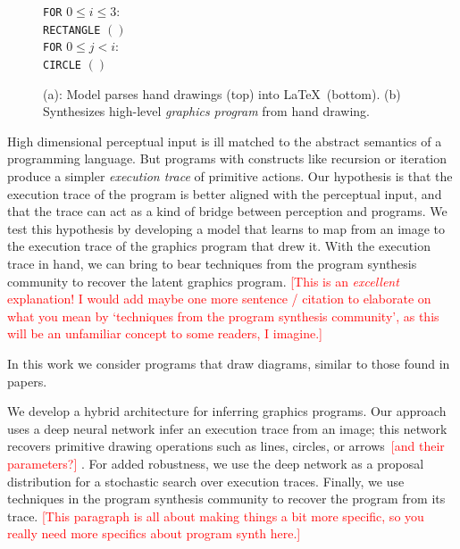 \documentclass{article}
\newcommand{\remark}[1]{\textcolor{red}{[#1]}}
\begin{document}
\begin{figure}[h]
\begin{minipage}[t]{0.8\linewidth}
\begin{tabular}{llll}
\end{tabular}
\subcaption{}
  \end{minipage}%
  \begin{minipage}[t]{0.2\linewidth}
    \texttt{FOR} $0\leq i\leq 3$:\\
    \texttt{RECTANGLE} $()$\\
    \texttt{FOR} $0\leq j < i$:\\
    \texttt{CIRCLE} $()$\\
    \subcaption{}
  \end{minipage}
  \caption{(a): Model parses hand drawings (top) into \LaTeX~(bottom). (b) Synthesizes high-level \emph{graphics program} from hand drawing.}
  \end{figure}

High dimensional perceptual input is ill matched to the abstract
semantics of a programming language. But programs with constructs like
recursion or iteration produce a simpler \emph{execution trace} of
primitive actions. Our hypothesis is that the execution trace of the
program is better aligned with the perceptual input, and that the
trace can act as a kind of bridge between perception and programs. We
test this hypothesis by developing a model that learns to map from an
image to the execution trace of the graphics program that drew it.
With the execution trace in hand, we can bring to bear techniques from
the program synthesis community to recover the latent graphics program.
\remark{This is an \emph{excellent} explanation! I would add maybe one more sentence / citation to elaborate on what you mean by `techniques from the program synthesis community', as this will be an unfamiliar concept to some readers, I imagine.}



In this work we consider programs that draw diagrams, similar to those found in papers.

We develop a hybrid architecture for inferring graphics programs.  Our
approach uses a deep neural network infer an execution trace from an image;
this network recovers primitive drawing operations such as lines, circles, or
arrows~\remark{and their parameters?}
. For added robustness, we use the deep network as a proposal
distribution for a stochastic search over execution traces.
Finally, we use techniques in the program synthesis community to
recover the program from its trace.
\remark{This paragraph is all about making things a bit more specific, so you really need more specifics about program synth here.}
\end{document}

